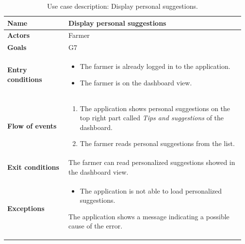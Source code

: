 \begin{table}[H]
    \centering
	\begin{tabular}{@{}p{0.25\linewidth} p{0.72\linewidth}@{}}
\toprule
		\textbf{Name}               & Display personal suggestions\\
		\midrule
		\textbf{Actors}             & Farmer\\
		\midrule
		\textbf{Goals}              & G7 \\
		\midrule
		
		\textbf{Entry conditions}   & \begin{itemize}[leftmargin=.4cm,noitemsep,topsep=0pt,before=\vspace{-3mm},after=\vspace{-4mm}]
		    \item The farmer is already logged in to the application.
		    \item The farmer is on the dashboard view.
		\end{itemize}\\
		\midrule
		
		\textbf{Flow of events}     & \begin{enumerate}[leftmargin=.4cm,noitemsep,topsep=0pt,before=\vspace{-3mm},after=\vspace{-4mm}]
		    \item The application shows personal suggestions on the top right part called \textit{Tips and suggestions} of the dashboard.
		    \item The farmer reads personal suggestions from the list.
		\end{enumerate}\\
		\midrule
		\textbf{Exit conditions}    & The farmer can read personalized suggestions showed in the dashboard view. \\
		\midrule
		
		\textbf{Exceptions}         & 
	    \begin{itemize}[leftmargin=.4cm,noitemsep,topsep=0pt,before=\vspace{-3mm}]
		   \item The application is not able to load personalized suggestions.
		\end{itemize}
		The application shows a message indicating a possible cause of the error.
		\\\bottomrule
	\end{tabular}
	\caption{Use case description: Display personal suggestions.} 
\end{table}


